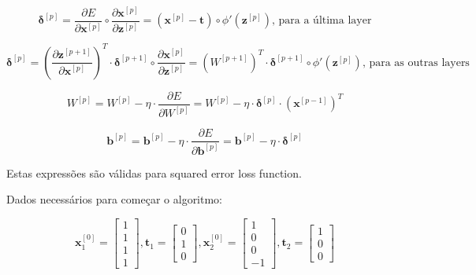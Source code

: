 \documentclass[a4paper,12pt]{article} %
\begin{document}
\begin{enumerate}
\begin{equation}
    \bm{\delta}^{[p]} = \frac{\partial E}{\partial \textbf{x}^{[p]}} \circ \frac{\partial \textbf{x}^{[p]}}{\partial \textbf{z}^{[p]}} = (\textbf{x}^{[p]} - \mathbf{t}) \circ \phi'(\mathbf{z}^{[p]}) \text{, para a última layer}
\end{equation}    

\begin{equation}
    \bm{\delta}^{[p]} = (\frac{\partial \textbf{z}^{[p+1]}}{\partial \textbf{x}^{[p]}})^T \cdot \bm{\delta}^{[p+1]} \circ \frac{\partial \textbf{x}^{[p]}}{\partial \textbf{z}^{[p]}} = ({W}^{[p+1]})^T \cdot \bm{\delta}^{[p+1]} \circ \phi'(\textbf{z}^{[p]}) \text{, para as outras layers}
\end{equation}

\begin{equation}
    {W}^{[p]} = {W}^{[p]} - \eta \cdot \frac{\partial E}{\partial {W}^{[p]}} = {W}^{[p]} - \eta \cdot \bm{\delta}^{[p]} \cdot (\textbf{x}^{[p-1]})^T
\end{equation}

\begin{equation}
    \textbf{b}^{[p]} = \textbf{b}^{[p]} - \eta \cdot \frac{\partial E}{\partial \textbf{b}^{[p]}} = \textbf{b}^{[p]} - \eta \cdot \bm{\delta}^{[p]}
\end{equation}

Estas expressões são válidas para squared error loss function.

Dados necessários para começar o algoritmo:

\begin{equation*}
    \textbf{x}^{[0]}_1 = \begin{bmatrix} 1 \\ 1 \\ 1 \\ 1 \end{bmatrix} , \textbf{t}_1 = \begin{bmatrix} 0 \\ 1 \\ 0 \end{bmatrix} , \textbf{x}^{[0]}_2 = \begin{bmatrix} 1 \\ 0 \\ 0 \\ -1 \end{bmatrix} , \textbf{t}_2 = \begin{bmatrix} 1 \\ 0 \\ 0 \end{bmatrix}
\end{equation*}


\end{enumerate}
\end{document}
